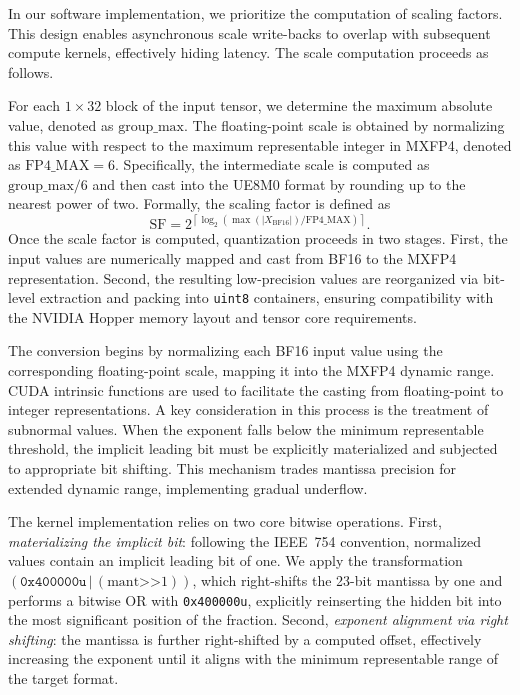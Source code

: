 In our software implementation, we prioritize the computation of scaling factors. This design enables asynchronous scale write-backs to overlap with subsequent compute kernels, effectively hiding latency. The scale computation proceeds as follows.

For each $1 \times 32$ block of the input tensor, we determine the maximum absolute value, denoted as $\mathrm{group\_max}$. The floating-point scale is obtained by normalizing this value with respect to the maximum representable integer in MXFP4, denoted as $\mathrm{FP4\_MAX}=6$. Specifically, the intermediate scale is computed as $\mathrm{group\_max} / 6$ and then cast into the UE8M0 format by rounding up to the nearest power of two. Formally, the scaling factor is defined as
\[
\mathrm{SF} = 2^{\left\lceil \log_2 \left( \max(|X_{\mathrm{BF16}}|) / \mathrm{FP4\_MAX} \right) \right\rceil} .
\]
Once the scale factor is computed, quantization proceeds in two stages. First, the input values are numerically mapped and cast from BF16 to the MXFP4 representation. Second, the resulting low-precision values are reorganized via bit-level extraction and packing into \texttt{uint8} containers, ensuring compatibility with the NVIDIA Hopper memory layout and tensor core requirements.

The conversion begins by normalizing each BF16 input value using the corresponding floating-point scale, mapping it into the MXFP4 dynamic range. CUDA intrinsic functions are used to facilitate the casting from floating-point to integer representations. A key consideration in this process is the treatment of subnormal values. When the exponent falls below the minimum representable threshold, the implicit leading bit must be explicitly materialized and subjected to appropriate bit shifting. This mechanism trades mantissa precision for extended dynamic range, implementing gradual underflow.

The kernel implementation relies on two core bitwise operations. First, \emph{materializing the implicit bit}: following the IEEE~754 convention, normalized values contain an implicit leading bit of one. We apply the transformation $(\texttt{0x400000u} \,\texttt{|}\, (\mathrm{mant} \texttt{>>} 1))$, which right-shifts the 23-bit mantissa by one and performs a bitwise OR with \texttt{0x400000u}, explicitly reinserting the hidden bit into the most significant position of the fraction. Second, \emph{exponent alignment via right shifting}: the mantissa is further right-shifted by a computed offset, effectively increasing the exponent until it aligns with the minimum representable range of the target format.

